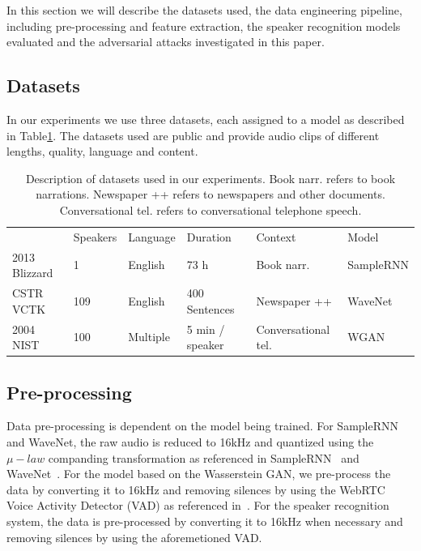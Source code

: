 In this section we will describe the datasets used, the data engineering
pipeline, including pre-processing and feature extraction, the speaker
recognition models evaluated and the adversarial attacks investigated in this paper.

\subsection{Datasets}
In our experiments we use three datasets, each assigned to a model as described
in Table\ref{tbl:datasets}. The datasets used are public and provide audio clips
of different lengths, quality, language and content.

\begin{table}[!h]
\centering
\begin{tabular}{llllll}
                                                                     & \cellcolor[HTML]{C0C0C0}Speakers & \cellcolor[HTML]{C0C0C0}Language & \cellcolor[HTML]{C0C0C0}Duration & \cellcolor[HTML]{C0C0C0}Context & \cellcolor[HTML]{C0C0C0}Model \\ \cline{2-6} 
\multicolumn{1}{l|}{\cellcolor[HTML]{C0C0C0}2013 Blizzard} & 1                                & English                          & 73 h                             & Book narr.                  & SampleRNN                     \\
\multicolumn{1}{l|}{\cellcolor[HTML]{C0C0C0}CSTR VCTK}               & 109                              & English                          & 400 Sentences                    & Newspaper ++               & WaveNet                       \\
\multicolumn{1}{l|}{\cellcolor[HTML]{C0C0C0}2004 NIST}               & 100                              & Multiple                         & 5 min / speaker                  & Conversational tel. & WGAN                         
\end{tabular}
\bigskip
\caption{Description of datasets used in our experiments. Book narr. refers to
    book narrations. Newspaper ++ refers to newspapers and other documents.
    Conversational tel. refers to conversational telephone speech.}
\label{tbl:datasets}
\end{table}

\subsection{Pre-processing}
\label{sub:processdata}
Data pre-processing is dependent on the model being trained. For SampleRNN and
WaveNet, the raw audio is reduced to 16kHz and quantized using the $\mu-law$
companding transformation as referenced in SampleRNN~\cite{mehri2016samplernn}
and WaveNet~\cite{van2016wavenet}. For the model based on the Wasserstein GAN,
we pre-process the data by converting it to 16kHz and removing silences by using
the WebRTC Voice Activity Detector (VAD) as referenced
in~\cite{zeidan2014webrtc}. For the speaker recognition system, the data is
pre-processed by converting it to 16kHz when necessary and removing silences by
using the aforemetioned VAD. 

